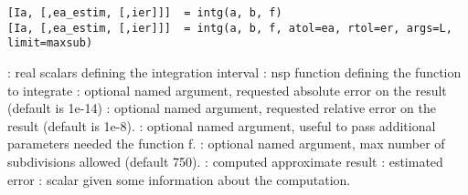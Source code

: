 
\begin{mandesc}
\end{mandesc}

\begin{calling_sequence}
\begin{verbatim}
[Ia, [,ea_estim, [,ier]]]  = intg(a, b, f)
[Ia, [,ea_estim, [,ier]]]  = intg(a, b, f, atol=ea, rtol=er, args=L, limit=maxsub)
\end{verbatim}
\end{calling_sequence}
\begin{parameters}
  \begin{varlist}
    :  real scalars defining the integration interval
    : nsp function defining the function to integrate
    : optional named argument, requested absolute error
                      on the result (default is 1e-14)
    : optional named argument, requested relative error
                      on the result (default is 1e-8).
    : optional named argument, useful to pass
    additional parameters needed the function f.
    : optional named argument, max number of
    subdivisions allowed (default 750).
    : computed approximate result
    : estimated error
    : scalar given some information about the computation.
  \end{varlist}
\end{parameters}

